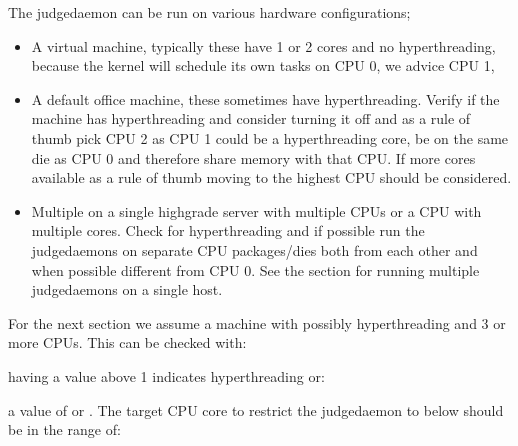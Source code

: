 \documentclass[a4paper,10pt,english,openany]{sphinxmanual}
\begin{document}
\sphinxAtStartPar
The judgedaemon can be run on various hardware configurations;
\begin{itemize}
\item {} 
\sphinxAtStartPar
A virtual machine, typically these have 1 or 2 cores and no hyperthreading, because the kernel will schedule its own tasks on CPU 0, we advice CPU 1,

\item {} 
\sphinxAtStartPar
A default office machine, these sometimes have hyperthreading. Verify if the machine has hyperthreading and consider turning it off and as a rule of thumb pick CPU 2 as CPU 1 could be a hyperthreading core, be on the same die as CPU 0 and therefore share memory with that CPU. If more cores available as a rule of thumb moving to the highest CPU should be considered.

\item {} 
\sphinxAtStartPar
Multiple on a single high\sphinxhyphen{}grade server with multiple CPUs or a CPU with multiple cores. Check for hyperthreading and if possible run the judgedaemons on separate CPU packages/dies both from each other and when possible different from CPU 0. See the section {\hyperref[\detokenize{config-advanced:multiple-judgedaemons}]{}} for running multiple judgedaemons on a single host.

\end{itemize}

\sphinxAtStartPar
For the next section we assume a machine with possibly hyperthreading and 3 or more CPUs. This can be checked with:

\begin{sphinxVerbatim}[commandchars=\\\{\}]
   
\end{sphinxVerbatim}

\sphinxAtStartPar
having a value above 1 indicates hyperthreading or:

\begin{sphinxVerbatim}[commandchars=\\\{\}]
 
\end{sphinxVerbatim}

\sphinxAtStartPar
a value of  or . The target CPU core to restrict the judgedaemon to below should be in the range of:
\end{document}
